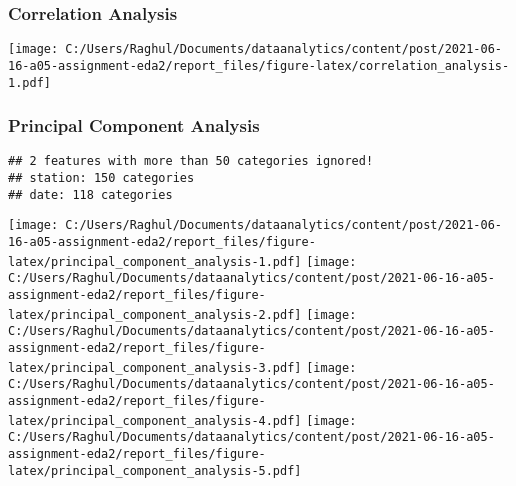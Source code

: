 \documentclass[
]{article}
\begin{document}
\hypertarget{correlation-analysis}{%
\subsubsection{Correlation Analysis}\label{correlation-analysis}}

\texttt{[image: C:/Users/Raghul/Documents/dataanalytics/content/post/2021-06-16-a05-assignment-eda2/report\_files/figure-latex/correlation\_analysis-1.pdf]}

\hypertarget{principal-component-analysis}{%
\subsubsection{Principal Component
Analysis}\label{principal-component-analysis}}

\begin{verbatim}
## 2 features with more than 50 categories ignored!
## station: 150 categories
## date: 118 categories
\end{verbatim}

\texttt{[image: C:/Users/Raghul/Documents/dataanalytics/content/post/2021-06-16-a05-assignment-eda2/report\_files/figure-latex/principal\_component\_analysis-1.pdf]}
\texttt{[image: C:/Users/Raghul/Documents/dataanalytics/content/post/2021-06-16-a05-assignment-eda2/report\_files/figure-latex/principal\_component\_analysis-2.pdf]}
\texttt{[image: C:/Users/Raghul/Documents/dataanalytics/content/post/2021-06-16-a05-assignment-eda2/report\_files/figure-latex/principal\_component\_analysis-3.pdf]}
\texttt{[image: C:/Users/Raghul/Documents/dataanalytics/content/post/2021-06-16-a05-assignment-eda2/report\_files/figure-latex/principal\_component\_analysis-4.pdf]}
\texttt{[image: C:/Users/Raghul/Documents/dataanalytics/content/post/2021-06-16-a05-assignment-eda2/report\_files/figure-latex/principal\_component\_analysis-5.pdf]}
\end{document}
